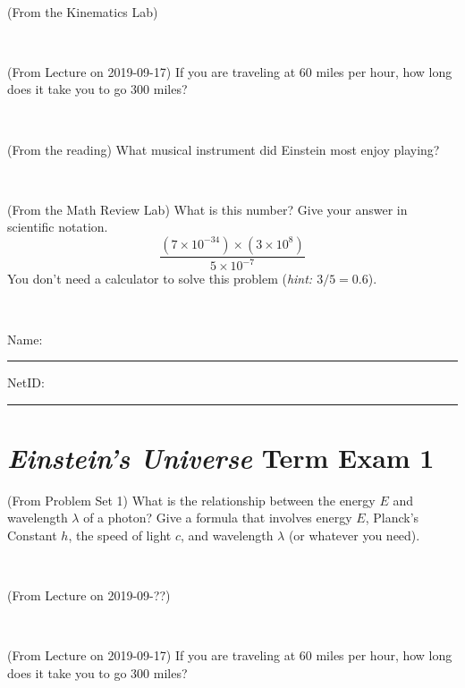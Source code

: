 \documentclass[12pt, letterpaper]{article}
\begin{document}
\vfill ~


\clearpage


\begin{problem} (From the Kinematics Lab)

\end{problem}


\vfill ~

\begin{problem} (From Lecture on 2019-09-17)
If you are traveling at 60 miles per hour, how long does
it take you to go 300 miles?
\end{problem}


\vfill ~

\begin{problem} (From the reading)
What musical instrument did Einstein most enjoy playing?
\end{problem}


\vfill ~

\begin{problem} (From the Math Review Lab)
What is this number? Give your answer in scientific notation.
$$
\frac{(7\times10^{-34})\times(3\times10^8)}{5\times10^{-7}}
$$
You don't need a calculator to solve this problem (\textit{hint: $3/5=0.6$}).
\end{problem}


\vfill ~


\cleardoublepage



\noindent
Name: \rule[-1ex]{0.60\textwidth}{0.1pt}
NetID: \rule[-1ex]{0.20\textwidth}{0.1pt}

\section*{\textsl{Einstein's Universe} Term Exam 1}
\setcounter{problem}{1}


\begin{problem} (From Problem Set 1)
What is the relationship between the energy $E$ and wavelength
$\lambda$ of a photon? Give a formula that involves energy $E$,
Planck's Constant $h$, the speed of light $c$, and wavelength
$\lambda$ (or whatever you need).
\end{problem}

\vfill ~

\begin{problem} (From Lecture on 2019-09-??)
\end{problem}


\vfill ~

\begin{problem} (From Lecture on 2019-09-17)
If you are traveling at 60 miles per hour, how long does
it take you to go 300 miles?
\end{problem}
\end{document}

